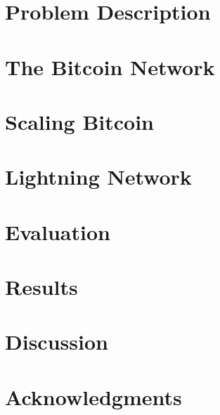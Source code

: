 \section{Problem Description}
    \label{sec:problem}
    

\clearpage
   
\clearpage
\section{The Bitcoin Network}
    \label{sec:bitcoin}
    
\clearpage
\section{Scaling Bitcoin}
    \label{sec:results}
%    
\clearpage
\section{Lightning Network}
\clearpage
\section{Evaluation}
\clearpage
\section{Results}
\clearpage
\section{Discussion}
    \label{sec:discussion}
\clearpage
\section{Acknowledgments}
    \label{sec:acknowledgments}
